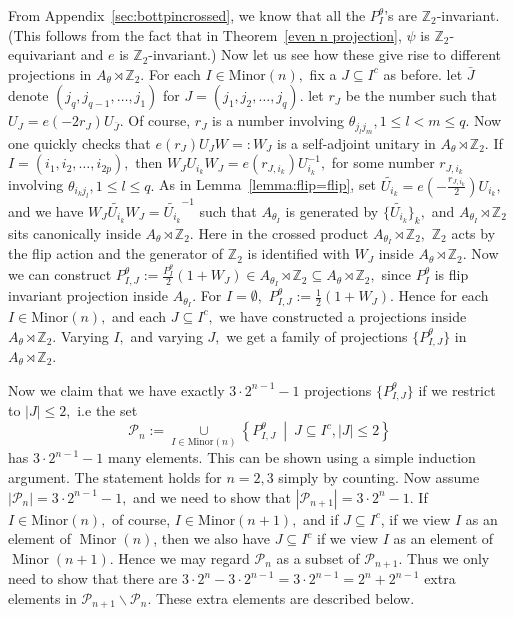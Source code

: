 \documentclass[9pt, BCOR=2mm]{amsart}
\numberwithin{equation}{section}
\numberwithin{equation}{section}
\newcommand{\Z}{{\mathbb{Z}}}
\newcommand{\suchthat}{\middle |}
\begin{document}
	  From Appendix~\ref{sec:bottpincrossed}, we know that all the $P_{I}^{\theta}$'s are $\Z_2$-invariant. (This follows from the fact that in Theorem~\ref{even n projection}, $\psi$ is $\Z_2$-equivariant and $e$ is $\Z_2$-invariant.) Now let us see how these give rise to different projections in $A_\theta\rtimes \Z_2.$ For each $I\in \mathrm{Minor}(n),$  fix a $J\subseteq I^c$ as before. let $\bar{J}$ denote $(j_q,j_{q-1},\dots,j_1)$ for $J=(j_1,j_2,\dots,j_q).$ let $r_J$ be the number such that $U_J=e(-2r_J)U_{\bar{J}}.$ Of course, $r_J$ is a number involving $\theta_{j_{l}j_{m}}, 1\le l< m\le q.$  Now one quickly checks that $e(r_J)U_JW=:W_J$ is a self-adjoint unitary in $A_\theta\rtimes \Z_2.$ If $I=(i_1,i_2,\dots,i_{2p}),$ then $W_JU_{i_k}W_J=e(r_{J,i_k})U_{i_k}^{-1},$ for some number $r_{J,i_k}$ involving $\theta_{i_kj_{l}}, 1\le l\le q.$ As in Lemma~\ref{lemma:flip=flip}, set $\widetilde{U_{i_k}}=e(-\frac{r_{J,i_k}}{2})U_{i_k},$ and we have  $W_J\widetilde{U_{i_k}}W_J=\widetilde{U_{i_k}}^{-1}$ such that $A_{\theta_I}$ is generated by $\{\widetilde{U_{i_k}}\}_k,$ and $A_{\theta_I}\rtimes \Z_2$ sits canonically inside $A_\theta\rtimes \Z_2.$ Here in the crossed product $A_{\theta_I}\rtimes \Z_2,$ $\Z_2$ acts by the flip action and the generator of $\Z_2$ is identified with $W_J$ inside $A_\theta\rtimes \Z_2.$ Now we can construct $P_{I,J}^{\theta}:=\frac{P_I^{\theta}}{2}(1+W_J)\in A_{\theta_I}\rtimes \Z_2 \subseteq A_\theta\rtimes \Z_2,$ since $P_I^{\theta}$ is flip invariant projection inside $A_{\theta_I}$. For $I=\emptyset,$ $P_{I,J}^{\theta}:=\frac{1}{2}(1+W_J).$ 
	  Hence for each $I\in \mathrm{Minor}(n),$ and each $J\subseteq I^c,$ we have constructed a projections inside $A_\theta\rtimes \Z_2.$ Varying $I,$ and varying $J,$ we get a family of projections $\{P_{I,J}^{\theta}\}$ in $A_\theta\rtimes \Z_2.$ 
	  
	  Now we claim that we have exactly $3\cdot2^{n-1}-1$ projections $\{P_{I,J}^{\theta}\}$ if we restrict to $|J|\le 2,$ i.e the set 
\begin{equation}\label{eq:def_of_P_n}
	\mathcal{P}_n:= \underset{I\in \mathrm{Minor}(n)}{\cup}\left\{P_{I,J}^{\theta}~\suchthat ~J\subseteq I^c,|J|\le 2 \right\}\end{equation} has $3\cdot2^{n-1}-1$ many elements. This can be shown using a simple induction argument. The statement holds for $n=2, 3$ simply by counting. Now assume $|\mathcal{P}_n|= 3\cdot2^{n-1}-1,$ and we need to show that $|\mathcal{P}_{n+1}|= 3\cdot2^{n}-1.$ If $I\in \mathrm{Minor}(n),$ of course, $I\in \mathrm{Minor}(n+1),$ and if $J \subseteq I^c$, if we view $I$ as an element of $\operatorname{Minor}(n)$, then we also have $J \subseteq I^c$ if we view $I$ as an element of $\operatorname{Minor}(n+1)$. Hence we may regard $\mathcal{P}_n$ as a subset of $\mathcal{P}_{n+1}$. Thus we only need to show that there are $3 \cdot 2^n-3 \cdot 2^{n-1}=3 \cdot 2^{n-1}=2^n+2^{n-1}$ extra elements in $\mathcal{P}_{n+1} \backslash \mathcal{P}_n$. These extra elements are described below.
	
\end{document}
